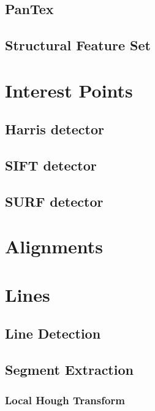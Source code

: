 

\subsection{PanTex}


\subsection{Structural Feature Set}


\section{Interest Points}
\subsection{Harris detector}

\subsection{SIFT detector}
\label{sec:SIFTDetector}
% 
\subsection{SURF detector}


\section{Alignments}
\label{sec:Alignments}

\section{Lines}
\label{sec:LineDetectors}

\subsection{Line Detection}
\label{sec:LineDetection}






\subsection{Segment Extraction}
\label{sec:SegmentExtraction}
\subsubsection{Local Hough Transform}

%
%

